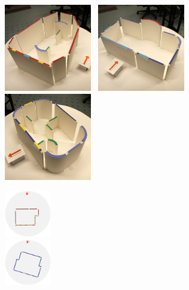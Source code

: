 \begin{figure}[t]
\begin{minipage}[b]{5.in}
  \includegraphics[width=1.50in]{../gi2012_userstudy/images/photos/38_new_design}~ %
  \includegraphics[width=1.50in]{../gi2012_userstudy/images/photos/68_new_design}~ %
  \includegraphics[width=1.50in]{../gi2012_userstudy/images/photos/98_new_design}~ %
\end{minipage}
\hfill
\begin{minipage}[b]{.8in}
  \includegraphics[width=0.80in]{../gi2012_userstudy/images/section4/0_2D_walls_rotate}\\ %
  \includegraphics[width=0.80in]{../gi2012_userstudy/images/section4/1_2D_walls_rotate} %
\end{minipage}


\end{figure}
